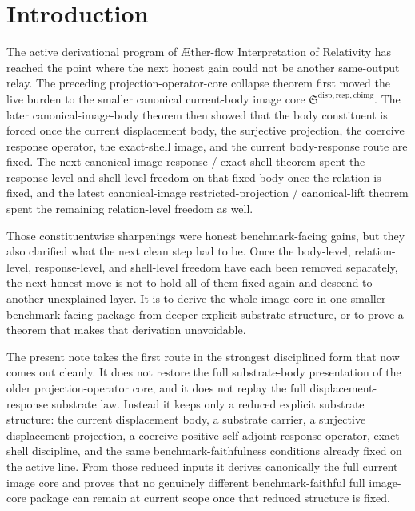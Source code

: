 \documentclass[11pt]{article}
\newcommand{\Aflow}{\AE{}ther-flow}
\newcommand{\TheoryName}{\Aflow{} Interpretation of Relativity}
\newcommand{\CurrentBodyImageCore}{\mathfrak S^{\mathrm{disp,resp,cbimg}}}
\begin{document}
\section{Introduction}

The active derivational program of \TheoryName{} has reached the point where the next honest gain could not be another same-output relay. The preceding projection-operator-core collapse theorem first moved the live burden to the smaller canonical current-body image core \(\CurrentBodyImageCore\). The later canonical-image-body theorem then showed that the body constituent is forced once the current displacement body, the surjective projection, the coercive response operator, the exact-shell image, and the current body-response route are fixed. The next canonical-image-response / exact-shell theorem spent the response-level and shell-level freedom on that fixed body once the relation is fixed, and the latest canonical-image restricted-projection / canonical-lift theorem spent the remaining relation-level freedom as well.

Those constituentwise sharpenings were honest benchmark-facing gains, but they also clarified what the next clean step had to be. Once the body-level, relation-level, response-level, and shell-level freedom have each been removed separately, the next honest move is not to hold all of them fixed again and descend to another unexplained layer. It is to derive the whole image core in one smaller benchmark-facing package from deeper explicit substrate structure, or to prove a theorem that makes that derivation unavoidable.

The present note takes the first route in the strongest disciplined form that now comes out cleanly. It does not restore the full substrate-body presentation of the older projection-operator core, and it does not replay the full displacement-response substrate law. Instead it keeps only a reduced explicit substrate structure: the current displacement body, a substrate carrier, a surjective displacement projection, a coercive positive self-adjoint response operator, exact-shell discipline, and the same benchmark-faithfulness conditions already fixed on the active line. From those reduced inputs it derives canonically the full current image core and proves that no genuinely different benchmark-faithful full image-core package can remain at current scope once that reduced structure is fixed.
\end{document}

